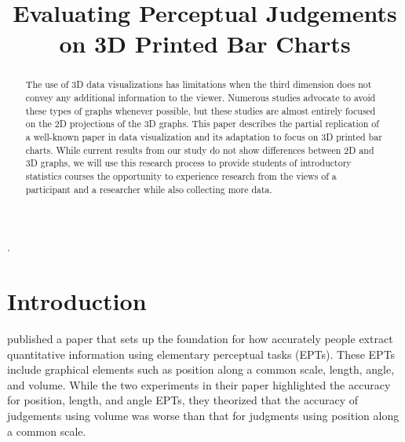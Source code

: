 \documentclass[letterpaper,inpress]{jdsart}
\begin{document}
\begin{frontmatter}

\title{Evaluating Perceptual Judgements on 3D Printed Bar Charts}

\author[1]{
      }
\author[1]{
    }

\address[1]{Department of Statistics, 
  , }

\begin{abstract}
The use of 3D data visualizations has limitations when the third dimension does not convey any additional information to the viewer. Numerous studies advocate to avoid these types of graphs whenever possible, but these studies are almost entirely focused on the 2D projections of the 3D graphs. This paper describes the partial replication of a well-known paper in data visualization and its adaptation to focus on 3D printed bar charts. While current results from our study do not show differences between 2D and 3D graphs, we will use this research process to provide students of introductory statistics courses the opportunity to experience research from the views of a participant and a researcher while also collecting more data.
\end{abstract}

\begin{keywords}
.
\end{keywords}

\end{frontmatter}

\hypertarget{introduction}{%
\section{Introduction}\label{introduction}}

\citet{cleveland_graphical_1984} published a paper that sets up the foundation for how accurately people extract quantitative information using elementary perceptual tasks (EPTs). These EPTs include graphical elements such as position along a common scale, length, angle, and volume. While the two experiments in their paper highlighted the accuracy for position, length, and angle EPTs, they theorized that the accuracy of judgements using volume was worse than that for judgments using position along a common scale.
\end{document}
